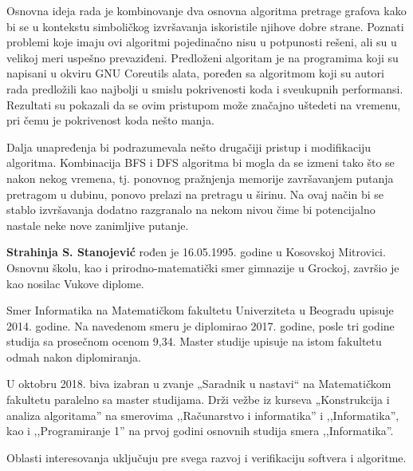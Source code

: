 \documentclass[12pt,oneside]{memoir}
\begin{document}
Osnovna ideja rada je kombinovanje dva osnovna algoritma pretrage grafova kako bi se u kontekstu simboličkog izvršavanja iskoristile njihove dobre strane. Poznati problemi koje imaju ovi algoritmi pojedinačno nisu u potpunosti rešeni, ali su u velikoj meri uspešno prevaziđeni. Predloženi algoritam je na programima koji su napisani u okviru GNU Coreutils alata, poređen sa algoritmom koji su autori rada\cite{klee} predložili kao najbolji u smislu pokrivenosti koda i sveukupnih performansi. Rezultati su pokazali da se ovim pristupom može značajno uštedeti na vremenu, pri čemu je pokrivenost koda nešto manja.

Dalja unapređenja bi podrazumevala nešto drugačiji pristup i modifikaciju algoritma. Kombinacija BFS i DFS algoritma bi mogla da se izmeni tako što se nakon nekog vremena, tj. ponovnog pražnjenja memorije završavanjem putanja pretragom u dubinu, ponovo prelazi na pretragu u širinu. Na ovaj način bi se stablo izvršavanja dodatno razgranalo na nekom nivou čime bi potencijalno nastale neke nove zanimljive putanje.
\printbibliography[heading=bibintoc,title=\foreignlanguage{serbian}{Literatura}]

\backmatter

\begin{biografija}
\textbf{Strahinja S. Stanojević} rođen je 16.05.1995. godine u Kosovskoj Mitrovici. Osnovnu školu, kao i prirodno-matematički smer gimnazije u Grockoj, završio je kao nosilac Vukove diplome. 

Smer Informatika na Matematičkom fakultetu Univerziteta u Beogradu upisuje 2014. godine. Na navedenom smeru je diplomirao 2017. godine, posle tri godine studija sa prosečnom ocenom 9,34. Master studije upisuje na istom fakultetu odmah nakon diplomiranja. 

U oktobru 2018. biva izabran u zvanje „Saradnik u nastavi“ na Matematičkom fakultetu paralelno sa master studijama. Drži vežbe iz kurseva „Konstrukcija i analiza algoritama” na smerovima ,,Računarstvo i informatika'' i ,,Informatika'', kao i ,,Programiranje 1'' na prvoj godini osnovnih studija smera ,,Informatika''. 

Oblasti interesovanja uključuju pre svega razvoj i verifikaciju softvera i algoritme.
\end{biografija}
\end{document}
